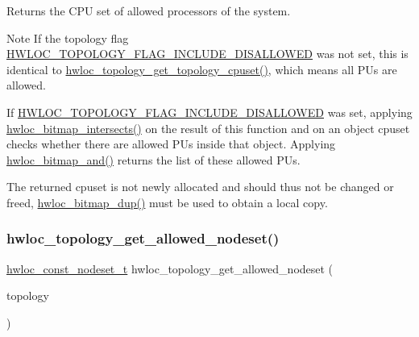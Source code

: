 \begin{DoxyReturn}{Returns}
the C\+PU set of allowed processors of the system.
\end{DoxyReturn}
\begin{DoxyNote}{Note}
If the topology flag \hyperlink{a00193_ggada025d3ec20b4b420f8038d23d6e7bdea10907044bbb306fd0dc76acf046d9258}{H\+W\+L\+O\+C\+\_\+\+T\+O\+P\+O\+L\+O\+G\+Y\+\_\+\+F\+L\+A\+G\+\_\+\+I\+N\+C\+L\+U\+D\+E\+\_\+\+D\+I\+S\+A\+L\+L\+O\+W\+ED} was not set, this is identical to \hyperlink{a00202_ga79212faa07b70dd26588941b17d9fa82}{hwloc\+\_\+topology\+\_\+get\+\_\+topology\+\_\+cpuset()}, which means all P\+Us are allowed.

If \hyperlink{a00193_ggada025d3ec20b4b420f8038d23d6e7bdea10907044bbb306fd0dc76acf046d9258}{H\+W\+L\+O\+C\+\_\+\+T\+O\+P\+O\+L\+O\+G\+Y\+\_\+\+F\+L\+A\+G\+\_\+\+I\+N\+C\+L\+U\+D\+E\+\_\+\+D\+I\+S\+A\+L\+L\+O\+W\+ED} was set, applying \hyperlink{a00205_gaefa070f9232857ba5a57297ea9a08ea2}{hwloc\+\_\+bitmap\+\_\+intersects()} on the result of this function and on an object cpuset checks whether there are allowed P\+Us inside that object. Applying \hyperlink{a00205_ga674533016ffed922a28b4f0b49b82cd4}{hwloc\+\_\+bitmap\+\_\+and()} returns the list of these allowed P\+Us.

The returned cpuset is not newly allocated and should thus not be changed or freed, \hyperlink{a00205_gae679434c1a5f41d3560a8a7e2c1b0dee}{hwloc\+\_\+bitmap\+\_\+dup()} must be used to obtain a local copy. 
\end{DoxyNote}
\mbox{\label{a00202_ga21a4d7237a11e76b912ed4524ab78cbd}} 
\subsubsection{\texorpdfstring{hwloc\+\_\+topology\+\_\+get\+\_\+allowed\+\_\+nodeset()}{hwloc\_topology\_get\_allowed\_nodeset()}}
{\footnotesize\ttfamily \hyperlink{a00183_ga2f5276235841ad66a79bedad16a5a10c}{hwloc\+\_\+const\+\_\+nodeset\+\_\+t} hwloc\+\_\+topology\+\_\+get\+\_\+allowed\+\_\+nodeset (\begin{DoxyParamCaption}\item[{\hyperlink{a00186_ga9d1e76ee15a7dee158b786c30b6a6e38}{hwloc\+\_\+topology\+\_\+t}}]{topology }\end{DoxyParamCaption})}



